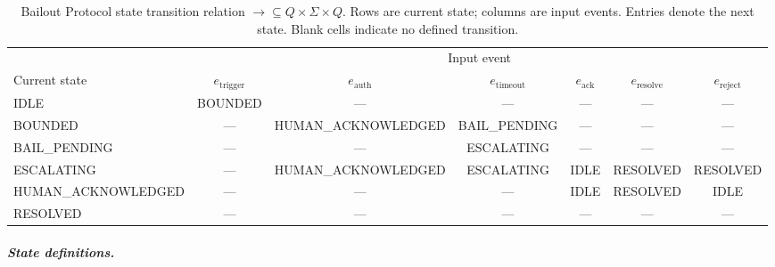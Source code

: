 \begin{table}[htbp]
\caption{Bailout Protocol state transition relation $\rightarrow \subseteq Q \times \Sigma \times Q$. Rows are current state; columns are input events. Entries denote the next state. Blank cells indicate no defined transition.}
\label{tab:transition-relation}
\begin{tabular}{@{}lcccccc@{}}
\toprule
 & \multicolumn{6}{c}{Input event} \\
\cmidrule(l){2-7}
Current state & $e_{\text{trigger}}$ & $e_{\text{auth}}$ & $e_{\text{timeout}}$ & $e_{\text{ack}}$ & $e_{\text{resolve}}$ & $e_{\text{reject}}$ \\
\midrule
IDLE & BOUNDED & — & — & — & — & — \\
BOUNDED & — & HUMAN\_ACKNOWLEDGED & BAIL\_PENDING & — & — & — \\
BAIL\_PENDING & — & — & ESCALATING & — & — & — \\
ESCALATING & — & HUMAN\_ACKNOWLEDGED & ESCALATING & IDLE & RESOLVED & RESOLVED \\
HUMAN\_ACKNOWLEDGED & — & — & — & IDLE & RESOLVED & IDLE \\
RESOLVED & — & — & — & — & — & — \\
\bottomrule
\end{tabular}
\end{table}

\subparagraph{State definitions.}

